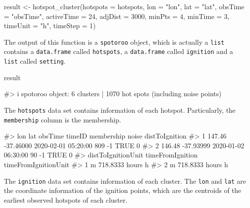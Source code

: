 \begin{Schunk}
\begin{Sinput}
result <- hotspot_cluster(hotspots = hotspots,
                          lon = "lon",
                          lat = "lat",
                          obsTime = "obsTime",
                          activeTime = 24,
                          adjDist = 3000,
                          minPts = 4,
                          minTime = 3,
                          timeUnit = "h",
                          timeStep = 1)
\end{Sinput}
\end{Schunk}

The output of this function is a \texttt{spotoroo} object, which is
actually a \texttt{list} contains a \texttt{data.frame} called
\texttt{hotspots}, a \texttt{data.frame} called \texttt{ignition} and a
\texttt{list} called \texttt{setting}.

\begin{Schunk}
\begin{Sinput}
result
\end{Sinput}
\begin{Soutput}
#> i spotoroo object: 6 clusters | 1070 hot spots (including noise points)
\end{Soutput}
\end{Schunk}

The \texttt{hotspots} data set contains information of each hotspot.
Particularly, the \texttt{membership} column is the membership.

\begin{Schunk}
\begin{Soutput}
#>      lon       lat             obsTime timeID membership noise distToIgnition
#> 1 147.46 -37.46000 2020-02-01 05:20:00    809         -1  TRUE              0
#> 2 146.48 -37.93999 2020-01-02 06:30:00     90         -1  TRUE              0
#>   distToIgnitionUnit timeFromIgnition timeFromIgnitionUnit
#> 1                  m   718.8333 hours                    h
#> 2                  m   718.8333 hours                    h
\end{Soutput}
\end{Schunk}

The \texttt{ignition} data set contains information of each cluster. The
\texttt{lon} and \texttt{lat} are the coordinate information of the
ignition points, which are the centroids of the earliest observed
hotspots of each cluster.

